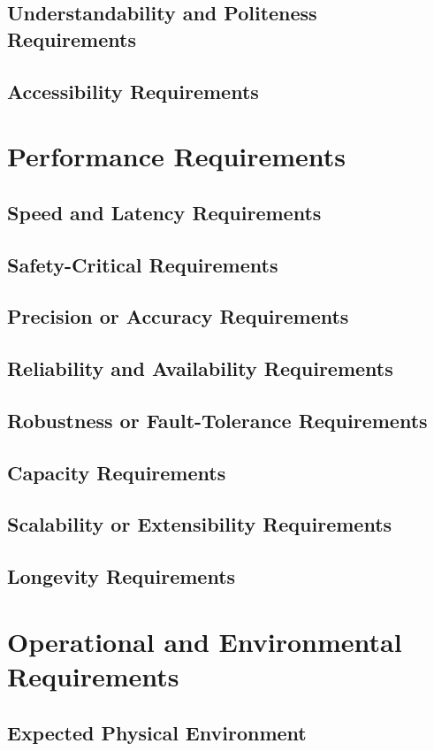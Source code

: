 \documentclass[paper=letter, fontsize=10pt]{scrartcl}
\numberwithin{equation}{section}		%
\numberwithin{figure}{section}			%
\numberwithin{table}{section}				%
\begin{document}
\subsection{Understandability and Politeness Requirements}
\subsection{Accessibility Requirements}

\section{Performance Requirements}
\subsection{Speed and Latency Requirements}
\subsection{Safety-Critical Requirements}
\subsection{Precision or Accuracy Requirements}
\subsection{Reliability and Availability Requirements}
\subsection{Robustness or Fault-Tolerance Requirements}
\subsection{Capacity Requirements}
\subsection{Scalability or Extensibility Requirements}
\subsection{Longevity Requirements}

\section{Operational and Environmental Requirements}
\subsection{Expected Physical Environment}
\end{document}
